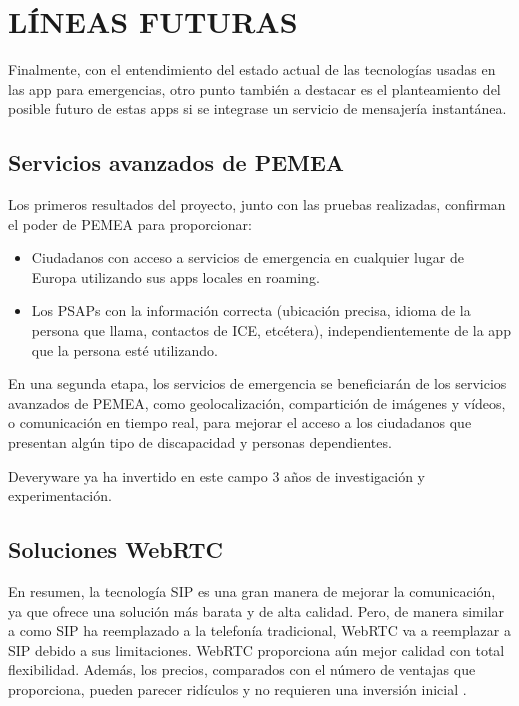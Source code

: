 \chapter{LÍNEAS FUTURAS\label{sec:lineasfuturas}}

\clearpage

Finalmente, con el entendimiento del estado actual de las tecnologías usadas en las app para emergencias, otro punto también a destacar es el planteamiento del posible futuro de estas apps si se integrase un servicio de mensajería instantánea.

\section{Servicios avanzados de PEMEA}

Los primeros resultados del proyecto, junto con las pruebas realizadas, confirman el poder de PEMEA para proporcionar:

\begin{itemize}
  \item Ciudadanos con acceso a servicios de emergencia en cualquier lugar de Europa utilizando sus apps locales en roaming.
  \item Los PSAPs con la información correcta (ubicación precisa, idioma de la persona que llama, contactos de ICE, etcétera), independientemente de la app que la persona esté utilizando.
\end{itemize}

En una segunda etapa, los servicios de emergencia se beneficiarán de los servicios avanzados de PEMEA, como geolocalización, compartición de imágenes y vídeos, o comunicación en tiempo real, para mejorar el acceso a los ciudadanos que presentan algún tipo de discapacidad y personas dependientes.

Deveryware ya ha invertido en este campo 3 años de investigación y experimentación.

\section{Soluciones WebRTC}

En resumen, la tecnología SIP es una gran manera de mejorar la comunicación, ya que ofrece una solución más barata y de alta calidad. Pero, de manera similar a como SIP ha reemplazado a la telefonía tradicional, WebRTC va a reemplazar a SIP debido a sus limitaciones. WebRTC proporciona aún mejor calidad con total flexibilidad. Además, los precios, comparados con el número de ventajas que proporciona, pueden parecer ridículos y no requieren una inversión inicial \cite{webrtc2}.

